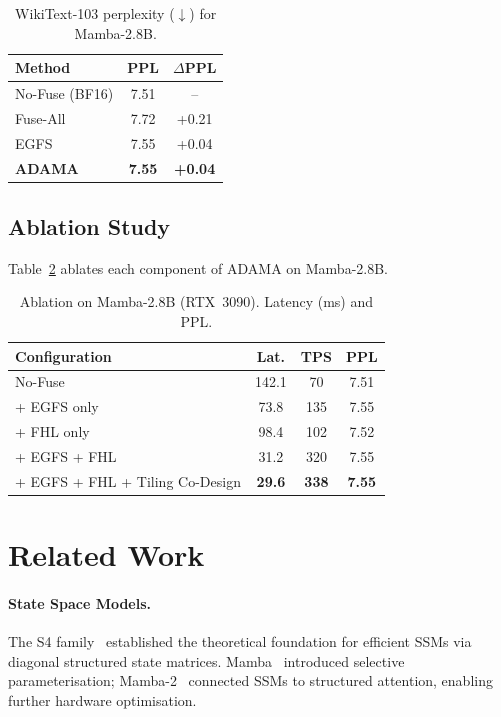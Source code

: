 \documentclass{article}
\begin{document}
\begin{table}[t]
  \centering
  \caption{WikiText-103 perplexity ($\downarrow$) for Mamba-2.8B.}
  \label{tab:ppl}
  \begin{tabular}{lcc}
    \toprule
    \textbf{Method} & \textbf{PPL} & $\Delta$\textbf{PPL} \\
    \midrule
    No-Fuse (BF16) & 7.51 & -- \\
    Fuse-All       & 7.72 & +0.21 \\
    EGFS           & 7.55 & +0.04 \\
    \textbf{ADAMA} & \textbf{7.55} & \textbf{+0.04} \\
    \bottomrule
  \end{tabular}
\end{table}

\subsection{Ablation Study}
\label{sec:exp:ablation}

Table~\ref{tab:ablation} ablates each component of ADAMA on Mamba-2.8B.

\begin{table}[t]
  \centering
  \caption{Ablation on Mamba-2.8B (RTX~3090).  Latency (ms) and PPL.}
  \label{tab:ablation}
  \begin{tabular}{lccc}
    \toprule
    \textbf{Configuration} & \textbf{Lat.} & \textbf{TPS} & \textbf{PPL} \\
    \midrule
    No-Fuse                       & 142.1 &  70 & 7.51 \\
    + EGFS only                   &  73.8 & 135 & 7.55 \\
    + FHL only                    &  98.4 & 102 & 7.52 \\
    + EGFS + FHL                  &  31.2 & 320 & 7.55 \\
    + EGFS + FHL + Tiling Co-Design & \textbf{29.6} & \textbf{338} & \textbf{7.55} \\
    \bottomrule
  \end{tabular}
\end{table}

\section{Related Work}
\label{sec:related}

\paragraph{State Space Models.}
The S4 family~\citep{gu2022efficiently} established the theoretical foundation
for efficient SSMs via diagonal structured state matrices.  Mamba~\citep{gu2023mamba}
introduced selective parameterisation; Mamba-2~\citep{dao2024mamba2} connected
SSMs to structured attention, enabling further hardware optimisation.
\end{document}
